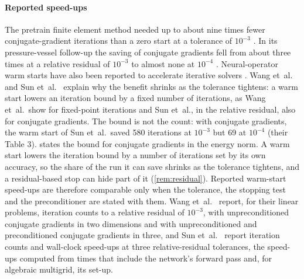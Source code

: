 \paragraph{Reported speed-ups}
The pretrain finite element method needed up to about nine times fewer conjugate-gradient
iterations than a zero start at a tolerance of $10^{-3}$ \cite{Wang2026PretrainFEM}. In its
pressure-vessel follow-up the saving of conjugate gradients fell from about three times at a
relative residual of $10^{-3}$ to almost none at $10^{-4}$ \cite{Sun2026FEVessel}. Neural-operator warm starts have also been
reported to accelerate iterative solvers
\cite{Eshaghi2026NOWS}. Wang et~al.~\cite{Wang2026PretrainFEM} and Sun
et~al.~\cite{Sun2026FEVessel} explain why the benefit shrinks as the tolerance tightens: a
warm start lowers an iteration bound by a fixed number of iterations, as Wang et~al.\ show
for fixed-point iterations and Sun et~al., in the relative residual, also for conjugate
gradients. The bound is not the count: with conjugate gradients, the warm start of Sun
et~al.\ saved 580 iterations at $10^{-3}$ but 69 at $10^{-4}$ (their Table 3).
 states the bound for conjugate gradients in the energy norm. A warm start lowers the iteration
bound by a number of iterations set by its own accuracy, so the share
of the run it can save shrinks as the tolerance tightens, and a residual-based stop can hide
part of it (\cref{rem:residual}). Reported warm-start speed-ups are therefore comparable
only when the tolerance, the stopping test and the preconditioner are stated with them. Wang et~al.~\cite{Wang2026PretrainFEM} report, for their linear problems, iteration counts to a
relative residual of $10^{-3}$, with unpreconditioned conjugate gradients in two dimensions
and with unpreconditioned and preconditioned conjugate gradients in three, and Sun
et~al.~\cite{Sun2026FEVessel} report iteration counts and wall-clock speed-ups at three
relative-residual tolerances, the speed-ups computed from times that include the network's
forward pass and, for algebraic multigrid, its set-up.
